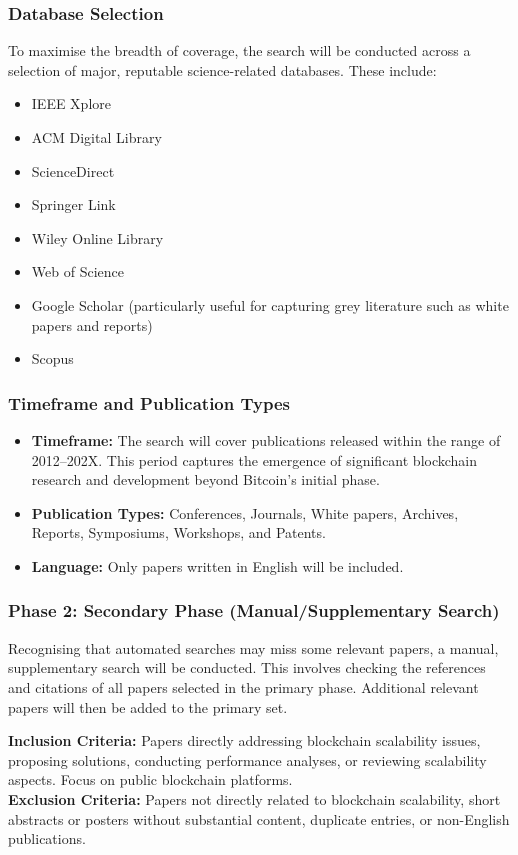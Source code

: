 \subsubsection{Database Selection}
To maximise the breadth of coverage, the search will be conducted across a selection of major, reputable science-related databases. These include:
\begin{itemize}
    \item IEEE Xplore
    \item ACM Digital Library
    \item ScienceDirect
    \item Springer Link
    \item Wiley Online Library
    \item Web of Science
    \item Google Scholar (particularly useful for capturing grey literature such as white papers and reports)
    \item Scopus
\end{itemize}

\subsubsection{Timeframe and Publication Types}
\begin{itemize}
    \item \textbf{Timeframe:} The search will cover publications released within the range of 2012--202X. This period captures the emergence of significant blockchain research and development beyond Bitcoin's initial phase.
    \item \textbf{Publication Types:} Conferences, Journals, White papers, Archives, Reports, Symposiums, Workshops, and Patents.
    \item \textbf{Language:} Only papers written in English will be included.
\end{itemize}

\subsubsection{Phase 2: Secondary Phase (Manual/Supplementary Search)}
Recognising that automated searches may miss some relevant papers, a manual, supplementary search will be conducted. This involves checking the references and citations of all papers selected in the primary phase. Additional relevant papers will then be added to the primary set.

\textbf{Inclusion Criteria:} Papers directly addressing blockchain scalability issues, proposing solutions, conducting performance analyses, or reviewing scalability aspects. Focus on public blockchain platforms. \\
\textbf{Exclusion Criteria:} Papers not directly related to blockchain scalability, short abstracts or posters without substantial content, duplicate entries, or non-English publications.

